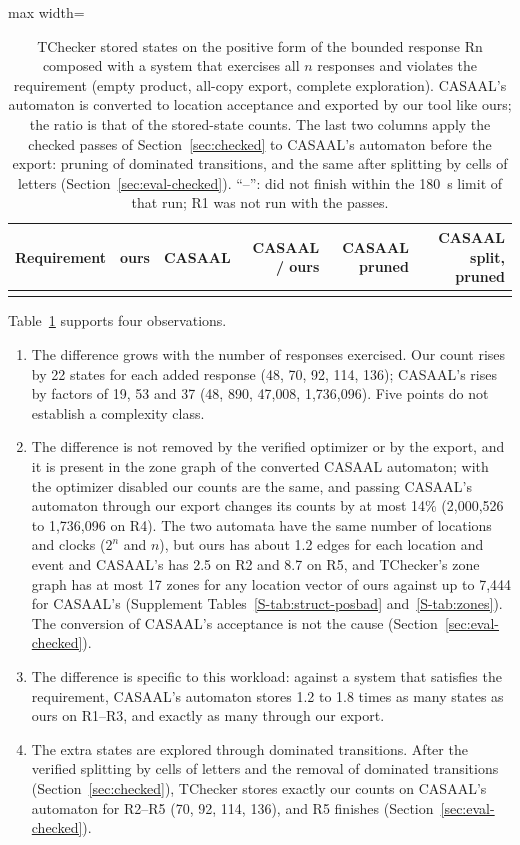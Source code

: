 \begin{table}[tp]
\centering
\caption{TChecker stored states on the positive form of the bounded response Rn composed with a system that exercises all $n$ responses and violates the requirement (empty product, all-copy export, complete exploration). CASAAL's automaton is converted to location acceptance and exported by our tool like ours; the ratio is that of the stored-state counts. The last two columns apply the checked passes of Section~\ref{sec:checked} to CASAAL's automaton before the export: pruning of dominated transitions, and the same after splitting by cells of letters (Section~\ref{sec:eval-checked}).  ``--'': did not finish within the 180~s limit of that run; R1 was not run with the passes.}
\label{tab:stress}
\small
\begin{adjustbox}{max width=\textwidth}\begin{tabular}{@{}lrrrrr@{}}
\toprule
Requirement & ours & CASAAL & CASAAL / ours & CASAAL pruned & CASAAL split, pruned \\
\midrule
\\
\bottomrule
\end{tabular}\end{adjustbox}
\end{table}
Table~\ref{tab:stress} supports four observations.
\begin{enumerate}
\item The difference grows with the number of responses exercised. Our count rises by 22 states for each added response (48, 70, 92, 114, 136); CASAAL's rises by factors of 19, 53 and 37 (48, 890, 47{,}008, 1{,}736{,}096). Five points do not establish a complexity class.
\item The difference is not removed by the verified optimizer or by the export, and it is present in the zone graph of the converted CASAAL automaton; with the optimizer disabled our counts are the same, and passing CASAAL's automaton through our export changes its counts by at most 14\% (2{,}000{,}526 to 1{,}736{,}096 on R4). The two automata have the same number of locations and clocks ($2^n$ and $n$), but ours has about 1.2 edges for each location and event and CASAAL's has 2.5 on R2 and 8.7 on R5, and TChecker's zone graph has at most 17 zones for any location vector of ours against up to 7{,}444 for CASAAL's (Supplement Tables~\ref{S-tab:struct-posbad} and~\ref{S-tab:zones}).  The conversion of CASAAL's acceptance is not the cause (Section~\ref{sec:eval-checked}).
\item The difference is specific to this workload: against a system that satisfies the requirement, CASAAL's automaton stores 1.2 to 1.8 times as many states as ours on R1--R3, and exactly as many through our export. 
\item The extra states are explored through dominated transitions. After the verified splitting by cells of letters and the removal of dominated transitions (Section~\ref{sec:checked}), TChecker stores exactly our counts on CASAAL's automaton for R2--R5 (70, 92, 114, 136), and R5 finishes (Section~\ref{sec:eval-checked}).
\end{enumerate}

